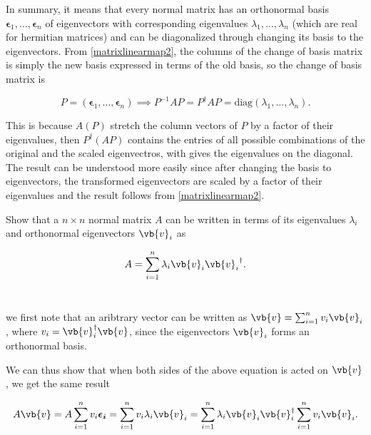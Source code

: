 \documentclass[a4paper,12pt]{report}
\begin{document}
    
In summary, it means that every normal matrix has an orthonormal basis \(\boldsymbol{\epsilon }_{1}, \ldots , \boldsymbol{\epsilon }_{n} \) of eigenvectors with corresponding eigenvalues $\lambda_1, \ldots, \lambda_n$ (which are real for hermitian matrices) and can be diagonalized through changing its basis to the eigenvectors. From \cref{matrixlinearmap2}, the columns of the change of basis matrix is simply the new basis expressed in terms of the old basis, so the change of basis matrix is

\begin{equation}
    P = (\boldsymbol{\epsilon }_{1}, \ldots , \boldsymbol{\epsilon }_{n}) \implies  P^{-1} AP = P^\dagger AP = \text{diag}(\lambda_1, \ldots, \lambda_n).
\end{equation}

This is because \(A(P)\) stretch the column vectors of \(P\) by a factor of their eigenvalues, then \(P^{\dagger} (AP)\) contains the entries of all possible combinations of the original and the scaled eigenvectros, with gives the eigenvalues on the diagonal. The result can be understood more easily since after changing the basis to eigenvectors, the transformed eigenvectors are scaled by a factor of their eigenvalues and the result follows from \cref{matrixlinearmap2}. 

{Show that a \(n \times n\) normal matrix \(A\) can be written in terms of its eigenvalues \(\lambda _{i} \) and orthonormal eigenvectors \(\vb{v}  _{i} \) as 

\begin{equation}
    A = \sum_{i=1}^{n} \lambda _{i} \vb{v}_{i}  {\vb{v}_{i}   }^{\dagger} .
\end{equation}~
}
{we first note that an aribtrary vector can be written as \(\vb{v} = \sum_{i=1}^{n} v_{i} \vb{v}_{i}  \), where \(v_{i} = \vb{v}_{i}^{\dagger} \vb{v}\), since the eigenvectors \(\vb{v}_{i}  \) forms an orthonormal basis.

We can thus show that when both sides of the above equation is acted on \(\vb{v} \), we get the same result 

\begin{equation}
    A\vb{v} = A\sum_{i=1}^{n} v_{i}\boldsymbol{\epsilon _{i} } = \sum_{i=1}^{n} v_{i} \lambda _{i} \vb{v}_{i} = \sum_{i=1}^{n} \lambda _{i} \vb{v}_{i}{\vb{v} }_{i} ^{\dagger}\sum_{i=1}^{n} v_{i} \vb{v}_{i}.   
\end{equation}~
} 
\end{document}
